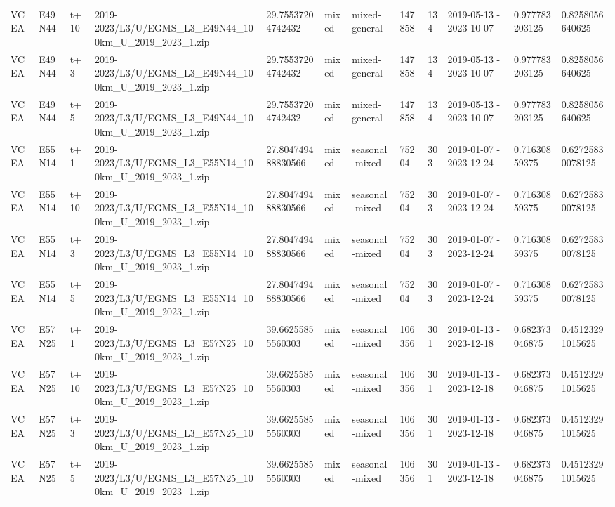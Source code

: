 \begin{landscape}
\begin{longtable}{llllllllllll}
VCEA & E49N44 & t+10 & 2019-2023/L3/U/EGMS\_L3\_E49N44\_100km\_U\_2019\_2023\_1.zip & 29.75537204742432 & mixed & mixed-general & 147858 & 134 & 2019-05-13 - 2023-10-07 & 0.977783203125 & 0.8258056640625 \\
VCEA & E49N44 & t+3 & 2019-2023/L3/U/EGMS\_L3\_E49N44\_100km\_U\_2019\_2023\_1.zip & 29.75537204742432 & mixed & mixed-general & 147858 & 134 & 2019-05-13 - 2023-10-07 & 0.977783203125 & 0.8258056640625 \\
VCEA & E49N44 & t+5 & 2019-2023/L3/U/EGMS\_L3\_E49N44\_100km\_U\_2019\_2023\_1.zip & 29.75537204742432 & mixed & mixed-general & 147858 & 134 & 2019-05-13 - 2023-10-07 & 0.977783203125 & 0.8258056640625 \\
VCEA & E55N14 & t+1 & 2019-2023/L3/U/EGMS\_L3\_E55N14\_100km\_U\_2019\_2023\_1.zip & 27.804749488830566 & mixed & seasonal-mixed & 75204 & 303 & 2019-01-07 - 2023-12-24 & 0.71630859375 & 0.62725830078125 \\
VCEA & E55N14 & t+10 & 2019-2023/L3/U/EGMS\_L3\_E55N14\_100km\_U\_2019\_2023\_1.zip & 27.804749488830566 & mixed & seasonal-mixed & 75204 & 303 & 2019-01-07 - 2023-12-24 & 0.71630859375 & 0.62725830078125 \\
VCEA & E55N14 & t+3 & 2019-2023/L3/U/EGMS\_L3\_E55N14\_100km\_U\_2019\_2023\_1.zip & 27.804749488830566 & mixed & seasonal-mixed & 75204 & 303 & 2019-01-07 - 2023-12-24 & 0.71630859375 & 0.62725830078125 \\
VCEA & E55N14 & t+5 & 2019-2023/L3/U/EGMS\_L3\_E55N14\_100km\_U\_2019\_2023\_1.zip & 27.804749488830566 & mixed & seasonal-mixed & 75204 & 303 & 2019-01-07 - 2023-12-24 & 0.71630859375 & 0.62725830078125 \\
VCEA & E57N25 & t+1 & 2019-2023/L3/U/EGMS\_L3\_E57N25\_100km\_U\_2019\_2023\_1.zip & 39.66255855560303 & mixed & seasonal-mixed & 106356 & 301 & 2019-01-13 - 2023-12-18 & 0.682373046875 & 0.45123291015625 \\
VCEA & E57N25 & t+10 & 2019-2023/L3/U/EGMS\_L3\_E57N25\_100km\_U\_2019\_2023\_1.zip & 39.66255855560303 & mixed & seasonal-mixed & 106356 & 301 & 2019-01-13 - 2023-12-18 & 0.682373046875 & 0.45123291015625 \\
VCEA & E57N25 & t+3 & 2019-2023/L3/U/EGMS\_L3\_E57N25\_100km\_U\_2019\_2023\_1.zip & 39.66255855560303 & mixed & seasonal-mixed & 106356 & 301 & 2019-01-13 - 2023-12-18 & 0.682373046875 & 0.45123291015625 \\
VCEA & E57N25 & t+5 & 2019-2023/L3/U/EGMS\_L3\_E57N25\_100km\_U\_2019\_2023\_1.zip & 39.66255855560303 & mixed & seasonal-mixed & 106356 & 301 & 2019-01-13 - 2023-12-18 & 0.682373046875 & 0.45123291015625 \\

\end{longtable}
\end{landscape}
